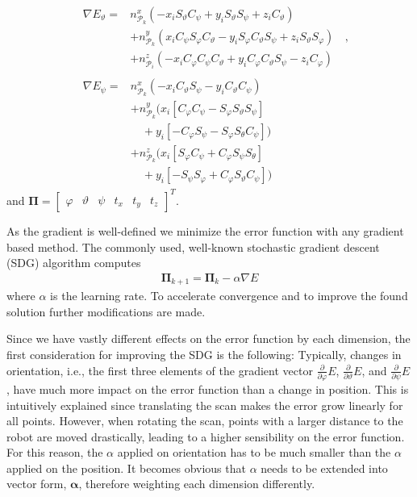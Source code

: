 \documentclass[5p]{elsarticle}
\renewcommand{\vec}[1]{\mathbf{#1}}
\newcommand{\pardiff}[1]{\frac{\partial}{\partial #1}}
\begin{document}
\begin{align}
&\begin{aligned}
\nabla E_\vartheta = & n_{\mathcal{P}_k}^x(-x_iS_\vartheta C_\psi + y_i S_\vartheta S_\psi + z_iC_\vartheta) \\
        &+ n_{\mathcal{P}_k}^y(x_iC_\psi S_\varphi C_\vartheta - y_iS_\varphi C_\vartheta S_\psi + z_i S_\vartheta S_\varphi)  \\
        &+ n_{\mathcal{P}_i}^z(-x_iC_\varphi C_\psi C_\vartheta + y_iC_\varphi C_\vartheta S_\psi - z_i C_\varphi)
\end{aligned}\;\; ,\\
&\begin{aligned}
	\nabla E_\psi = &n_{\mathcal{P}_k}^x\left(-x_iC_\vartheta S_\psi - y_iC_\vartheta C_\psi\right) \\
       &+ n_{\mathcal{P}_k}^y(x_i[C_\varphi C_\psi - S_\varphi S_\vartheta S_\psi]\\
       &\quad+ y_i[-C_\varphi S_\psi - S_\varphi S_\theta C_\psi]) \\
       &+ n_{\mathcal{P}_k}^z(x_i[S_\varphi C_\psi + C_\varphi S_\psi S_\theta] \\
       &\quad+ y_i[-S_\psi S_ \varphi + C_\varphi S_\vartheta C_\psi]) 
\end{aligned}
\end{align}
and $\vec{\Pi}=\begin{bmatrix}\varphi & \vartheta & \psi & t_x & t_y & t_z\end{bmatrix}^T$.

As the gradient is well-defined we minimize the error function with any gradient based method. 
The commonly used, well-known stochastic gradient descent (SDG) algorithm computes 
\begin{align}
    \vec{\Pi}_{k+1} = \vec{\Pi}_{k} - \alpha \nabla E
\end{align}
where $\alpha$ is the learning rate.
To accelerate convergence and to improve the found solution further modifications are made.

Since we have vastly different effects on the error function by each dimension, the first consideration for improving the SDG is the following:
Typically, changes in orientation, i.e., the first three elements of the gradient vector $\pardiff{\varphi}E$, $\pardiff{\vartheta}E$, and $\pardiff{\psi}E$, have much more impact on the error function than a change in position.
This is intuitively explained since translating the scan makes the error grow linearly for all points.
However, when rotating the scan, points with a larger distance to the robot are moved drastically, leading to a higher sensibility on the error function.
For this reason, the $\alpha$ applied on orientation has to be much smaller than the $\alpha$ applied on the position.
It becomes obvious that $\alpha$ needs to be extended into vector form, $\boldsymbol\alpha$, therefore weighting each dimension differently.
\end{document}
